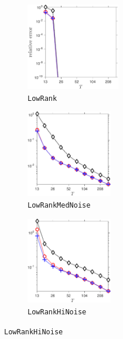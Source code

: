 \documentclass[final]{siamart1116}
\numberwithin{equation}{section}
\numberwithin{theorem}{section}
\numberwithin{figure}{section}
\begin{document}
\begin{figure}[htp!]
\begin{center}
\begin{subfigure}{.325\textwidth}
\begin{center}
\includegraphics[height=1.5in]{figures/LR_Alg789.pdf}
\caption{\texttt{LowRank}}
\label{fig:LR-789}
\end{center}
\end{subfigure}
\begin{subfigure}{.325\textwidth}
\begin{center}
\includegraphics[height=1.5in]{figures/MED_Alg789.pdf}
\caption{\texttt{LowRankMedNoise}}
\label{fig:MED-789}
\end{center}
\end{subfigure}
\begin{subfigure}{.325\textwidth}
\begin{center}
\includegraphics[height=1.5in]{figures/HI_Alg789.pdf}
\caption{\texttt{LowRankHiNoise}}
\label{fig:HI-789}
\end{center}
\end{subfigure}
\end{center}

\vspace{.5em}


\end{figure}
\end{document}
